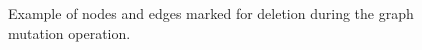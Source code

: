\documentclass{article}
\begin{document}
\begin{figure}
\centerline{
}
\caption{Example of nodes and edges marked for deletion during the graph mutation operation.}
\label{fig:mutationExample}
\end{figure}
\end{document}
